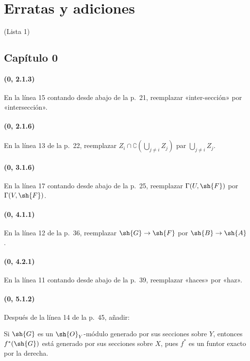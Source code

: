 {}
\section*{Erratas y adiciones}
\begin{center}
\large (Lista 1)
\end{center}

\subsection*{Capítulo 0}

\paragraph{(0, 2.1.3)}
En la línea 15 contando desde abajo de la p.~21, reemplazar
«inter-sección» por «intersección».

\paragraph{(0, 2.1.6)}
En la línea 13 de la p.~22, reemplazar
$Z_i\cap\complement(\bigcup\limits_{j\ne i}Z_j)$ par
$\bigcup\limits_{j\ne i}Z_j$.

\paragraph{(0, 3.1.6)}
En la línea 17 contando desde abajo de la p.~25, reemplazar
$\Gamma(U,\sh{F})$ por $\Gamma(V,\sh{F})$.

\paragraph{(0, 4.1.1)}
En la línea 12 de la p.~36, reemplazar $\sh{G}\to\sh{F}$ por
$\sh{B}\to\sh{A}$.

\paragraph{(0, 4.2.1)}
En la línea 11 contando desde abajo de la p.~39, reemplazar «haces» por
«haz».

\paragraph{(0, 5.1.2)}
Después de la línea 14 de la p.~45, añadir:

Si $\sh{G}$ es un $\sh{O}_Y$-módulo generado por sus secciones sobre
$Y$, entonces $f^*(\sh{G})$ está generado por sus secciones sobre $X$,
pues $f^*$ es un funtor exacto por la derecha.


